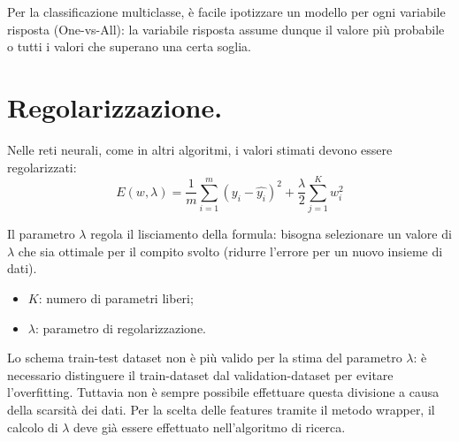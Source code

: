 \documentclass[11pt, a4page, twocolumn]{article}
\begin{document}
Per la classificazione multiclasse, è facile ipotizzare un modello per ogni variabile risposta (One-vs-All): la variabile risposta assume dunque il valore più probabile o tutti i valori che superano una certa soglia.


\section{Regolarizzazione.}
Nelle reti neurali, come in altri algoritmi, i valori stimati devono essere
regolarizzati:
\begin{equation*}
  E(w, \lambda{}) = \frac{1}{m} \sum^m_{i=1}{(y_i - \widehat{y_i})^2} + \frac{\lambda{}}{2} \sum^K_{j=1}{w_i^2}
\end{equation*}
  
Il parametro $\lambda$ regola il lisciamento della formula: bisogna selezionare un valore di $\lambda$ che sia ottimale per il compito svolto (ridurre l'errore per un nuovo insieme di dati).
\begin{itemize}
  \item $K$: numero di parametri liberi;
  \item $\lambda$: parametro di regolarizzazione.
\end{itemize}

Lo schema train-test dataset non è più valido per la stima del parametro $\lambda$: è necessario distinguere il train-dataset dal validation-dataset per evitare l'overfitting.
Tuttavia non è sempre possibile effettuare questa divisione a causa della scarsità dei dati. \newline
Per la scelta delle features tramite il metodo wrapper, il calcolo di $\lambda$ deve già essere effettuato nell'algoritmo di ricerca. \newline
\end{document}
